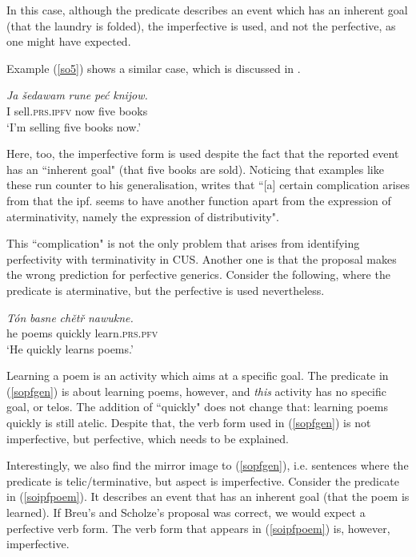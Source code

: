 \documentclass[output=paper,colorlinks,citecolor=brown]{langscibook}
\begin{document}
\noindent In this case, although the predicate describes an event which has an inherent goal (that the laundry is folded), the imperfective is used, and not the perfective, as one might have expected. 



Example (\ref{so5}) shows a similar case, which is discussed in \citet{Breu2000}. 

 \ea\label{so5}
\gll \textit{Ja} \textit{šedawam} \textit{rune} \textit{pe\'c} \textit{knijow.} \\
I sell.\textsc{prs.ipfv} now five books\\
\glt \normalsize{`I'm selling five books now.'}
\z

\noindent Here, too, the imperfective form is used despite the fact that the reported event has an ``inherent goal" (that five books are sold). Noticing that examples like these run counter to his generalisation, \citet[64]{Breu2000} writes that ``[a] certain complication arises from that the ipf. seems to have another function apart from the expression of aterminativity, namely the expression of distributivity".

This ``complication" is not the only problem that arises from identifying perfectivity with terminativity in CUS. Another one is that the proposal makes the wrong prediction for perfective generics. Consider the following, where the predicate is aterminative, but the perfective is used nevertheless.

 \ea\label{sopfgen}
\gll \textit{T\'on} \textit{basne} \textit{chětř} \textit{nawukne.} \\
he poems quickly learn.\textsc{prs.pfv}\\
\glt \normalsize{`He quickly learns poems.'}
\z

\noindent Learning a poem is an activity which aims at a specific goal. 
The predicate in (\ref{sopfgen}) is about learning poems, however, and \textit{this} activity has no specific goal, or telos. The addition of ``quickly" does not change that: learning poems quickly is still atelic. Despite that, the verb form used in (\ref{sopfgen}) is not imperfective, but perfective, which needs to be explained.    

Interestingly, we also find the mirror image to (\ref{sopfgen}), i.e. sentences where the predicate is telic/terminative, but aspect is imperfective. Consider 
the predicate in (\ref{soipfpoem}). It describes an event that has an inherent goal (that the poem is learned). If Breu's and Scholze's proposal was correct, we would expect a perfective verb form. The verb form that appears in (\ref{soipfpoem}) is, however, imperfective. 
\end{document}
